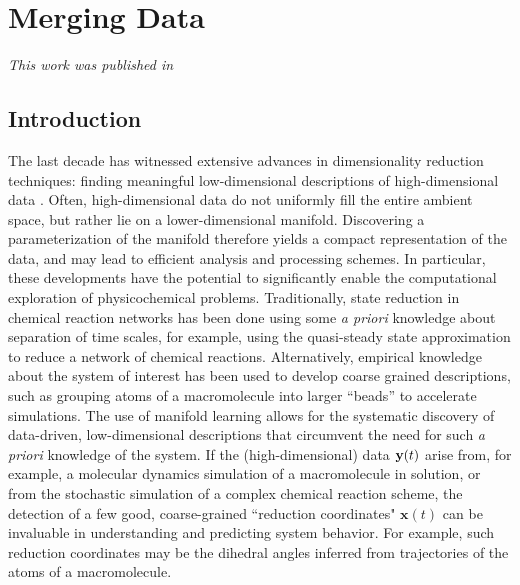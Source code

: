 \chapter{Merging Data\label{ch:merging}}

\graphicspath{{ch-merging/figures/}}

{\em This work was published in \citep{dsilva2013nonlinear}}

\section{Introduction}
The last decade has witnessed extensive advances in dimensionality reduction techniques:
finding meaningful low-dimensional descriptions of high-dimensional data \cite{tenenbaum2000global,roweis2000nonlinear,Donoho2003,Belkin2003,Coifman2006}.
%
Often, high-dimensional data do not uniformly fill the entire ambient space, but rather lie on a lower-dimensional manifold.
%
Discovering a parameterization of the manifold therefore yields a compact representation of the data, and may lead to efficient analysis and processing schemes.
%
In particular, these developments have the potential to significantly enable the computational exploration
of physicochemical problems.
%
Traditionally, state reduction in chemical reaction networks has been done using some {\em a priori} knowledge about separation of time scales,
for example, using the quasi-steady state approximation to reduce a network of chemical reactions\cite{bowen1963singular}.
%
Alternatively, empirical knowledge about the system of interest has been used to develop coarse grained descriptions,
such as grouping atoms of a macromolecule into larger ``beads'' to accelerate simulations\cite{monticelli2008martini, spiga2013electrostatic,izvekov2005systematic, saunders2013coarse}.
%
The use of manifold learning allows for the systematic discovery of data-driven, low-dimensional descriptions that circumvent the need for such {\em a priori} knowledge of the system.
%
If the (high-dimensional) data $\mathbf{y}(t)$ arise from, for example, a
molecular dynamics simulation of a macromolecule in solution, or from the stochastic
simulation of a complex chemical reaction scheme, the detection of a few good, coarse-grained
``reduction coordinates" $\mathbf{x}(t)$ can be invaluable in understanding and predicting system behavior.
%
For example, such reduction coordinates may be the dihedral angles inferred from trajectories of the atoms of a macromolecule.


